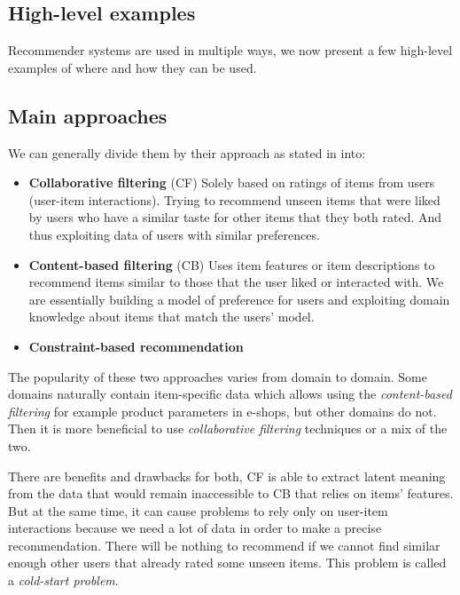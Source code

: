 \subsection*{High-level examples}
Recommender systems are used in multiple ways, we now present a few high-level examples of where and how they can be used.
\subsection*{Main approaches}

We can generally divide them by their approach as stated in \cite{RS_handbook-ricci2011} into:
\begin{itemize}
    \item \textbf{Collaborative filtering} (CF)\newline
        Solely based on ratings of items from users (user-item interactions). Trying to recommend unseen items that were liked by users who have a similar taste for other items that they both rated. And thus exploiting data of users with similar preferences.
    \item  \textbf{Content-based filtering} (CB)\newline
        Uses item features or item descriptions to recommend items similar to those that the user liked or interacted with. We are essentially building a model of preference for users and exploiting domain knowledge about items that match the users' model.
    \item \textbf{Constraint-based recommendation}\newline
        
\end{itemize}

The popularity of these two approaches varies from domain to domain. Some domains naturally contain item-specific data which allows using the \textit{content-based filtering} for example product parameters in e-shops, but other domains do not. Then it is more beneficial to use \textit{collaborative filtering} techniques or a mix of the two.

There are benefits and drawbacks for both, CF is able to extract latent meaning from the data that would remain inaccessible to CB that relies on items' features. But at the same time, it can cause problems to rely only on user-item interactions because we need a lot of data in order to make a precise recommendation. There will be nothing to recommend if we cannot find similar enough other users that already rated some unseen items. This problem is called a \textit{cold-start problem}.\newline

